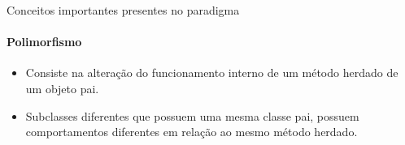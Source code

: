 \begin{frame}{Conceitos importantes presentes no paradigma}
\framesubtitle{Polimorfismo}
\begin{itemize}
    \item Consiste na alteração do funcionamento interno de um método herdado de um objeto pai.
    \item Subclasses diferentes que possuem uma mesma classe pai, possuem comportamentos diferentes em relação ao mesmo método herdado.
\end{itemize} 
\end{frame}